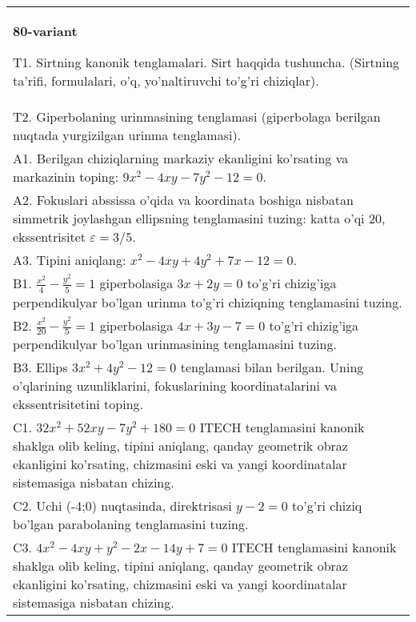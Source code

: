 \documentclass{article}
\begin{document}
\begin{tabular}{m{17cm}}
\textbf{80-variant}
\newline

T1. Sirtning kanonik tenglamalari. Sirt haqqida tushuncha. (Sirtning ta'rifi, formulalari, o'q, yo'naltiruvchi to'g'ri chiziqlar).\\

T2. Giperbolaning urinmasining tenglamasi (giperbolaga berilgan nuqtada yurgizilgan urinma tenglamasi).\\

A1. Berilgan chiziqlarning markaziy ekanligini ko'rsating va markazinin toping: $9x^{2}-4xy-7y^{2}-12=0$.\\

A2. Fokuslari abssissa o'qida va koordinata boshiga nisbatan simmetrik joylashgan ellipsning tenglamasini tuzing: katta o'qi $20$, ekssentrisitet $\varepsilon=3/5$.\\

A3. Tipini aniqlang: $x^{2}-4xy+4y^{2}+7x-12=0$.\\

B1. $\frac{x^{2}}{4} - \frac{y^{2}}{5} = 1$ giperbolasiga $3x + 2y = 0$ to'g'ri chizig'iga perpendikulyar bo'lgan urinma to'g'ri chiziqning tenglamasini tuzing.\\

B2. $\frac{x^{2}}{20} - \frac{y^{2}}{5} = 1$ giperbolasiga $4x + 3y - 7 = 0$ to'g'ri chizig'iga perpendikulyar bo'lgan urinmasining tenglamasini tuzing.  \\

B3. Ellips $3x^{2} + 4y^{2} - 12 = 0$ tenglamasi bilan berilgan. Uning o'qlarining uzunliklarini, fokuslarining koordinatalarini va ekssentrisitetini toping.  \\

C1. $32x^{2} + 52xy - 7y^{2} + 180 = 0$ ITECH tenglamasini kanonik shaklga olib keling, tipini aniqlang, qanday geometrik obraz ekanligini ko'rsating, chizmasini eski va yangi koordinatalar sistemasiga nisbatan chizing.  \\

C2. Uchi (-4;0) nuqtasinda, direktrisasi $y - 2 = 0$ to'g'ri chiziq bo'lgan parabolaning tenglamasini tuzing.\\

C3. $4x^{2} - 4xy + y^{2} - 2x - 14y + 7 = 0$ ITECH tenglamasini kanonik shaklga olib keling, tipini aniqlang, qanday geometrik obraz ekanligini ko'rsating, chizmasini eski va yangi koordinatalar sistemasiga nisbatan chizing.  \\

\end{tabular}
\vspace{1cm}
\end{document}
